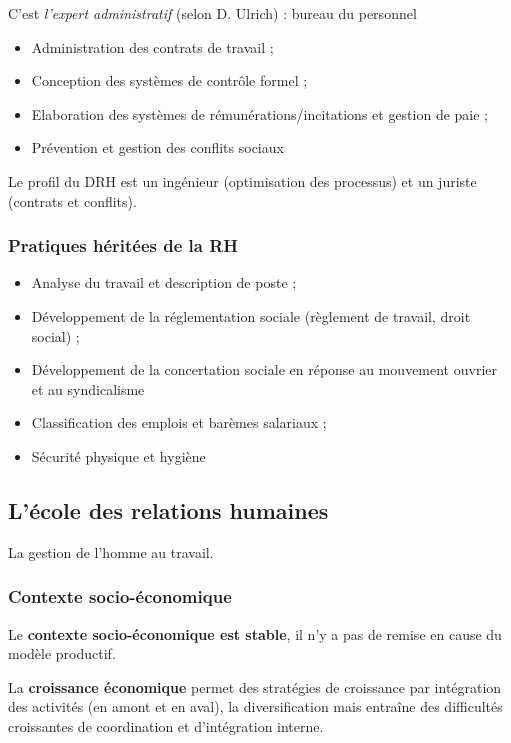 \documentclass[12pt]{article}
\begin{document}
	  C'est \emph{l'expert administratif} (selon D. Ulrich) : \og{} bureau du personnel \fg{}
	  
	  \begin{itemize}
	   \item Administration des contrats de travail ;
	   \item Conception des systèmes de contrôle formel ;
	   \item Elaboration des systèmes de rémunérations/incitations et gestion de paie ;
	   \item Prévention et gestion des conflits sociaux
	  \end{itemize}
	  
	  Le profil du DRH est un ingénieur (optimisation des processus) et un juriste (contrats et conflits).
	  
	  \subsubsection{Pratiques héritées de la RH}
	  
	  \begin{itemize}
	   \item Analyse du travail et description de poste ;
	   \item Développement de la réglementation sociale (règlement de travail, droit social) ;
	   \item Développement de la concertation sociale en réponse au mouvement ouvrier et au syndicalisme
	   \item Classification des emplois et barèmes salariaux ;
	   \item Sécurité physique et hygiène
	  \end{itemize}

	\subsection{L'école des relations humaines}
	La gestion de l'homme au travail.
	  \subsubsection{Contexte socio-économique}
	  
	  Le \textbf{contexte socio-économique est stable}, il n'y a pas de remise en cause du modèle productif.
	  
	  La \textbf{croissance économique} permet des stratégies de croissance par intégration des activités (en amont et en aval), la diversification mais entraîne des difficultés croissantes de coordination et d'intégration interne.
	  
\end{document}
